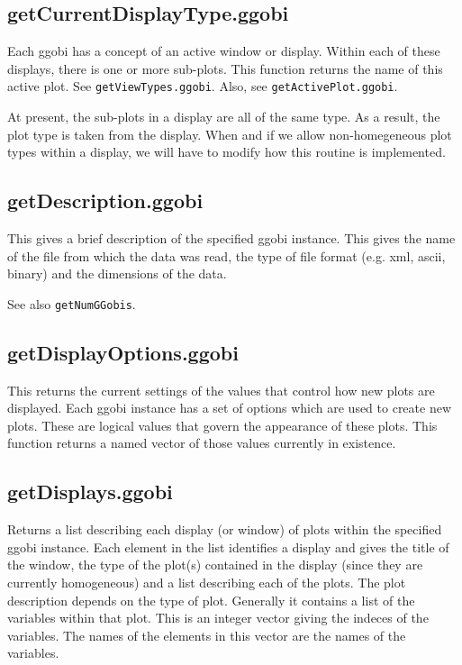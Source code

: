 \documentclass{article}
\def\SFunction#1{{\texttt{\red #1}}}
\begin{document}
\subsection{getCurrentDisplayType.ggobi}
Each ggobi has a concept of an active window or display. Within each
of these displays, there is one or more sub-plots.  This function
returns the name of this active plot.  See
\SFunction{getViewTypes.ggobi}.  Also, see
\SFunction{getActivePlot.ggobi}.

At present, the sub-plots in a display are all of the same type. As a
result, the plot type is taken from the display.  When and if we allow
non-homegeneous plot types within a display, we will have to modify
how this routine is implemented.

\subsection{getDescription.ggobi}
This gives a brief description of the specified ggobi instance.  This
gives the name of the file from which the data was read, the type of
file format (e.g. xml, ascii, binary) and the dimensions of the data.

See also \SFunction{getNumGGobis}.

\subsection{getDisplayOptions.ggobi}
This returns the current settings of the values that control how new
plots are displayed.  Each ggobi instance has a set of options which
are used to create new plots.  These are logical values that govern
the appearance of these plots.  This function returns a named vector
of those values currently in existence.



\subsection{getDisplays.ggobi}
Returns a list describing each display (or window) of plots within the
specified ggobi instance.  Each element in the list identifies a
display and gives the title of the window, the type of the plot(s)
contained in the display (since they are currently homogeneous) and a
list describing each of the plots.  The plot description depends on
the type of plot. Generally it contains a list of the variables within
that plot.  This is an integer vector giving the indeces of the
variables. The names of the elements in this vector are the names of
the variables. 
\end{document}
